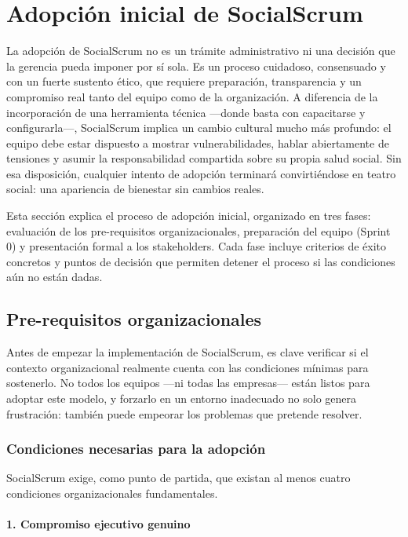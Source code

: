 \section{Adopción inicial de SocialScrum}

La adopción de SocialScrum no es un trámite administrativo ni una decisión que la gerencia pueda imponer por sí sola. Es un proceso cuidadoso, consensuado y con un fuerte sustento ético, que requiere preparación, transparencia y un compromiso real tanto del equipo como de la organización. A diferencia de la incorporación de una herramienta técnica —donde basta con capacitarse y configurarla—, SocialScrum implica un cambio cultural mucho más profundo: el equipo debe estar dispuesto a mostrar vulnerabilidades, hablar abiertamente de tensiones y asumir la responsabilidad compartida sobre su propia salud social. Sin esa disposición, cualquier intento de adopción terminará convirtiéndose en teatro social: una apariencia de bienestar sin cambios reales.

Esta sección explica el proceso de adopción inicial, organizado en tres fases: evaluación de los pre-requisitos organizacionales, preparación del equipo (Sprint 0) y presentación formal a los stakeholders. Cada fase incluye criterios de éxito concretos y puntos de decisión que permiten detener el proceso si las condiciones aún no están dadas.

\subsection{Pre-requisitos organizacionales}

Antes de empezar la implementación de SocialScrum, es clave verificar si el contexto organizacional realmente cuenta con las condiciones mínimas para sostenerlo. No todos los equipos —ni todas las empresas— están listos para adoptar este modelo, y forzarlo en un entorno inadecuado no solo genera frustración: también puede empeorar los problemas que pretende resolver.

\subsubsection{Condiciones necesarias para la adopción}

SocialScrum exige, como punto de partida, que existan al menos cuatro condiciones organizacionales fundamentales.

\paragraph{1. Compromiso ejecutivo genuino}


